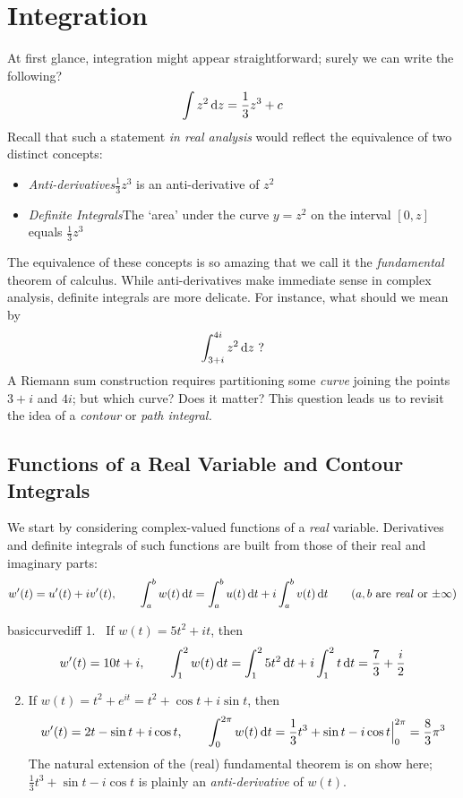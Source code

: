 \graphicspath{{4integrals/asy/}}
\thispagestyle{empty}


\section{Integration}

At first glance, integration might appear straightforward; surely we can write the following?
\[\int z^2\,{\mathrm{d} z}=\frac 13z^3+c\]
Recall that such a statement \emph{in real analysis} would reflect the equivalence of two distinct concepts:
\begin{itemize}\itemsep0pt
	\item[]\emph{Anti-derivatives}\quad $\frac 13z^3$ is an anti-derivative of $z^2$
	\item[]\emph{Definite Integrals}\quad The `area' under the curve $y=z^2$ on the interval $[0,z]$ equals $\frac 13z^3$
\end{itemize}
The equivalence of these concepts is so amazing that we call it the \emph{fundamental} theorem of calculus. While anti-derivatives make immediate sense in complex analysis, definite integrals are more delicate. For instance, what should we mean by
\[\int_{3+i}^{4i} z^2\,{\mathrm{d} z}\text{ ?}\]
A Riemann sum construction requires partitioning some \emph{curve} joining the points $3+i$ and $4i$; but which curve? Does it matter? This question leads us to revisit the idea of a \emph{contour} or \emph{path integral.}

\subsection{Functions of a Real Variable and Contour Integrals}\label{sec:contour}

We start by considering complex-valued functions of a \emph{real} variable. Derivatives and definite integrals of such functions are built from those of their real and imaginary parts:
\[w'(t)=u'(t)+iv'(t),\qquad \int_a^bw(t)\,\dt=\int_a^bu(t)\,\dt+i\int_a^bv(t)\,\dt \tag{$a,b$ are \emph{real} or $\pm\infty$}\]

\begin{examples}{}{basiccurvediff}
\hangindent\leftmargini
\textup{1.} \ If $w(t)=5t^2+it$, then
	\[w'(t)=10t+i,\qquad \int_1^2w(t)\,{\mathrm{d} t}=\int_1^25t^2\,{\mathrm{d} t}+i\int_1^2t\,{\mathrm{d} t} =\frac 73+\frac i2\]
\begin{enumerate}\setcounter{enumi}{1}
	\item If $w(t)=t^2+e^{it}=t^2+\cos t+i\sin t$, then
	\[w'(t)=2t-\sin t+i\cos t,\qquad \int_0^{2\pi}w(t)\,{\mathrm{d} t}=\frac 13t^3+\sin t-i\cos t\Big|_0^{2\pi}=\frac 83\pi^3\]
	The natural extension of the (real) fundamental theorem is on show here; $\frac 13t^3+\sin t-i\cos t$ is plainly an \emph{anti-derivative} of $w(t)$. 
\end{enumerate}
\end{examples}

